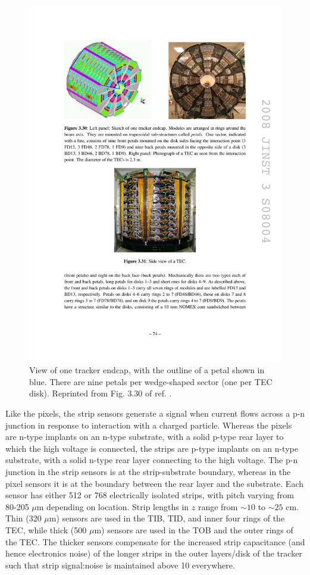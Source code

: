 \documentclass[dissertation.tex]{subfiles}
\begin{document}
\begin{figure}
	\centering
	\includegraphics[scale=1.0]{tracker_TEC}
	\caption{View of one tracker endcap, with the outline of a petal shown in blue.  There are nine petals per wedge-shaped sector (one per TEC disk).  Reprinted from Fig. 3.30 of ref. \cite{CMS_detector_paper}.}
	\label{fig:tracker_TEC}
\end{figure}

Like the pixels, the strip sensors generate a signal when current flows across a p-n junction in response to interaction with a charged particle.  Whereas the pixels are n-type implants on an n-type substrate, with a solid p-type rear layer to which the high voltage is connected, the strips are p-type implants on an n-type substrate, with a solid n-type rear layer connecting to the high voltage.  The p-n junction in the strip sensors is at the strip-substrate boundary, whereas in the pixel sensors it is at the boundary between the rear layer and the substrate.  Each sensor has either 512 or 768 electrically isolated strips, with pitch varying from 80-205 $\mu\mbox{m}$ depending on location.  Strip lengths in $z$ range from $\sim10$ to $\sim25$ cm.  Thin (320 $\mu\mbox{m}$) sensors are used in the TIB, TID, and inner four rings of the TEC, while thick (500 $\mu\mbox{m}$) sensors are used in the TOB and the outer rings of the TEC.  The thicker sensors compensate for the increased strip capacitance (and hence electronics noise) of the longer strips in the outer layers/disk of the tracker such that strip signal:noise is maintained above 10 everywhere.
\end{document}
